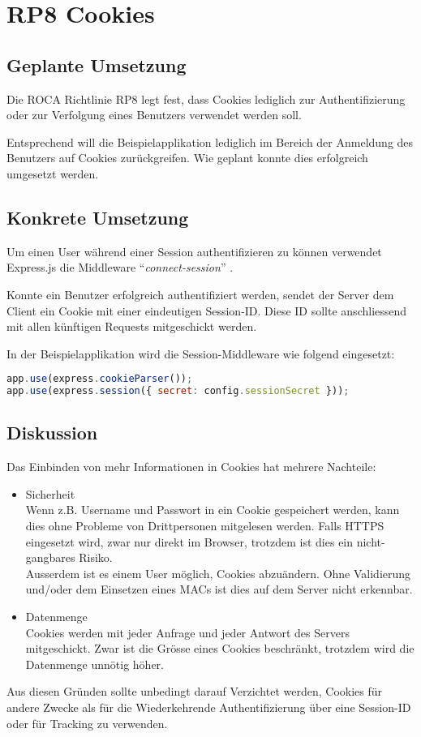 \section{RP8 Cookies}
\label{sec:principle-rp8-cookies}

\subsection*{Geplante Umsetzung}
Die ROCA Richtlinie RP8 legt fest, dass Cookies lediglich zur Authentifizierung oder zur Verfolgung eines Benutzers verwendet werden soll.

Entsprechend will die Beispielapplikation lediglich im Bereich der Anmeldung des Benutzers auf Cookies zurückgreifen. Wie geplant konnte dies erfolgreich umgesetzt werden.

\subsection*{Konkrete Umsetzung}
Um einen User während einer Session authentifizieren zu können verwendet Express.js \cite{Expressjs} die \gls{Middleware} ``\emph{connect-session}'' \cite{ConnectSession}.

Konnte ein Benutzer erfolgreich authentifiziert werden, sendet der Server dem Client ein Cookie mit einer eindeutigen Session-ID. Diese ID sollte anschliessend mit allen künftigen Requests mitgeschickt werden.

In der Beispielapplikation wird die Session-Middleware wie folgend eingesetzt:

\begin{lstlisting}[language=JavaScript, caption=Connect Session Middleware \cite{RoomiesMiddlewareHttp}, label=lst:connect-session-middleware]
app.use(express.cookieParser());
app.use(express.session({ secret: config.sessionSecret }));
\end{lstlisting}

\subsection*{Diskussion}
Das Einbinden von mehr Informationen in Cookies hat mehrere Nachteile:
\begin{itemize}
	\item Sicherheit \\
		Wenn z.B. Username und Passwort in ein Cookie gespeichert werden, kann dies ohne Probleme von Drittpersonen mitgelesen werden. Falls HTTPS eingesetzt wird, zwar nur direkt im Browser, trotzdem ist dies ein nicht-gangbares Risiko. \\
		Ausserdem ist es einem User möglich, Cookies abzuändern. Ohne Validierung und/oder dem Einsetzen eines \glspl{MAC} ist dies auf dem Server nicht erkennbar.
	\item Datenmenge \\
		Cookies werden mit jeder Anfrage und jeder Antwort des Servers mitgeschickt. Zwar ist die Grösse eines Cookies beschränkt, trotzdem wird die Datenmenge unnötig höher.
\end{itemize}

Aus diesen Gründen sollte unbedingt darauf Verzichtet werden, Cookies für andere Zwecke als für die Wiederkehrende Authentifizierung über eine Session-ID oder für Tracking zu verwenden.